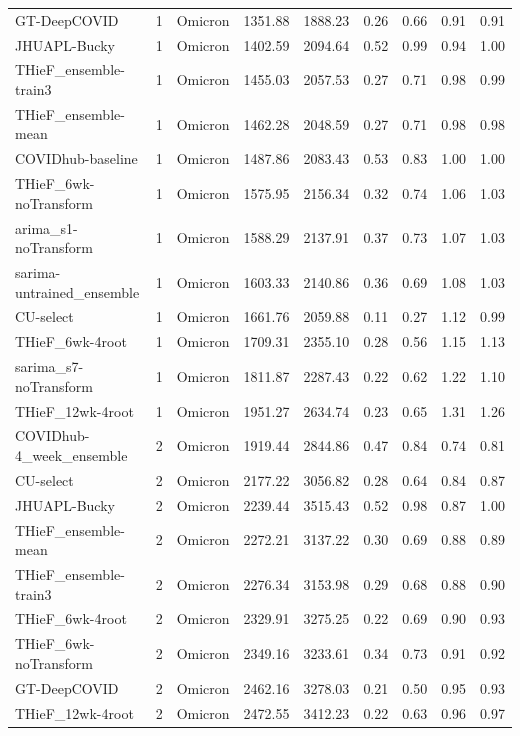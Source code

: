\documentclass[12pt]{article}
\begin{document}
\begin{longtable}{lrlrrrrrr}
  GT-DeepCOVID & 1 & Omicron & 1351.88 & 1888.23 & 0.26 & 0.66 & 0.91 & 0.91 \\ 
  JHUAPL-Bucky & 1 & Omicron & 1402.59 & 2094.64 & 0.52 & 0.99 & 0.94 & 1.00 \\ 
  THieF\_ensemble-train3 & 1 & Omicron & 1455.03 & 2057.53 & 0.27 & 0.71 & 0.98 & 0.99 \\ 
  THieF\_ensemble-mean & 1 & Omicron & 1462.28 & 2048.59 & 0.27 & 0.71 & 0.98 & 0.98 \\ 
  COVIDhub-baseline & 1 & Omicron & 1487.86 & 2083.43 & 0.53 & 0.83 & 1.00 & 1.00 \\ 
  THieF\_6wk-noTransform & 1 & Omicron & 1575.95 & 2156.34 & 0.32 & 0.74 & 1.06 & 1.03 \\ 
  arima\_s1-noTransform & 1 & Omicron & 1588.29 & 2137.91 & 0.37 & 0.73 & 1.07 & 1.03 \\ 
  sarima-untrained\_ensemble & 1 & Omicron & 1603.33 & 2140.86 & 0.36 & 0.69 & 1.08 & 1.03 \\ 
  CU-select & 1 & Omicron & 1661.76 & 2059.88 & 0.11 & 0.27 & 1.12 & 0.99 \\ 
  THieF\_6wk-4root & 1 & Omicron & 1709.31 & 2355.10 & 0.28 & 0.56 & 1.15 & 1.13 \\ 
  sarima\_s7-noTransform & 1 & Omicron & 1811.87 & 2287.43 & 0.22 & 0.62 & 1.22 & 1.10 \\ 
  THieF\_12wk-4root & 1 & Omicron & 1951.27 & 2634.74 & 0.23 & 0.65 & 1.31 & 1.26 \\ 
  COVIDhub-4\_week\_ensemble & 2 & Omicron & 1919.44 & 2844.86 & 0.47 & 0.84 & 0.74 & 0.81 \\ 
  CU-select & 2 & Omicron & 2177.22 & 3056.82 & 0.28 & 0.64 & 0.84 & 0.87 \\ 
  JHUAPL-Bucky & 2 & Omicron & 2239.44 & 3515.43 & 0.52 & 0.98 & 0.87 & 1.00 \\ 
  THieF\_ensemble-mean & 2 & Omicron & 2272.21 & 3137.22 & 0.30 & 0.69 & 0.88 & 0.89 \\ 
  THieF\_ensemble-train3 & 2 & Omicron & 2276.34 & 3153.98 & 0.29 & 0.68 & 0.88 & 0.90 \\ 
  THieF\_6wk-4root & 2 & Omicron & 2329.91 & 3275.25 & 0.22 & 0.69 & 0.90 & 0.93 \\ 
  THieF\_6wk-noTransform & 2 & Omicron & 2349.16 & 3233.61 & 0.34 & 0.73 & 0.91 & 0.92 \\ 
  GT-DeepCOVID & 2 & Omicron & 2462.16 & 3278.03 & 0.21 & 0.50 & 0.95 & 0.93 \\ 
  THieF\_12wk-4root & 2 & Omicron & 2472.55 & 3412.23 & 0.22 & 0.63 & 0.96 & 0.97 \\ 

\end{longtable}
\end{document}
